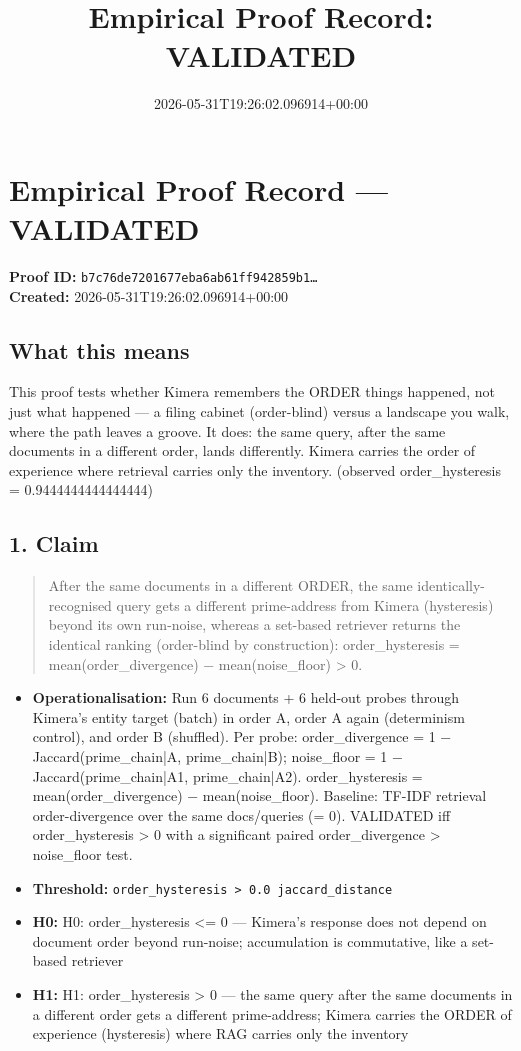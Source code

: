 \documentclass{article}
\title{Empirical Proof Record: VALIDATED}
\date{2026-05-31T19:26:02.096914+00:00}
\begin{document}
\maketitle
\section*{Empirical Proof Record --- \textcolor{validated}{\textbf{VALIDATED}}}
\textbf{Proof ID:} \texttt{b7c76de7201677eba6ab61ff942859b1\dots}\\
\textbf{Created:} 2026-05-31T19:26:02.096914+00:00
\subsection*{What this means}
This proof tests whether Kimera remembers the ORDER things happened, not just what happened — a filing cabinet (order-blind) versus a landscape you walk, where the path leaves a groove. It does: the same query, after the same documents in a different order, lands differently. Kimera carries the order of experience where retrieval carries only the inventory. (observed order\_hysteresis = 0.9444444444444444)
\subsection*{1. Claim}
\begin{quote}After the same documents in a different ORDER, the same identically-recognised query gets a different prime-address from Kimera (hysteresis) beyond its own run-noise, whereas a set-based retriever returns the identical ranking (order-blind by construction): order\_hysteresis = mean(order\_divergence) − mean(noise\_floor) > 0.\end{quote}
\begin{itemize}
\item \textbf{Operationalisation:} Run 6 documents + 6 held-out probes through Kimera's entity target (batch) in order A, order A again (determinism control), and order B (shuffled). Per probe: order\_divergence = 1 − Jaccard(prime\_chain|A, prime\_chain|B); noise\_floor = 1 − Jaccard(prime\_chain|A1, prime\_chain|A2). order\_hysteresis = mean(order\_divergence) − mean(noise\_floor). Baseline: TF-IDF retrieval order-divergence over the same docs/queries (= 0). VALIDATED iff order\_hysteresis > 0 with a significant paired order\_divergence > noise\_floor test.
\item \textbf{Threshold:} \texttt{order\_hysteresis > 0.0 jaccard\_distance}
\item \textbf{H0:} H0: order\_hysteresis <= 0 — Kimera's response does not depend on document order beyond run-noise; accumulation is commutative, like a set-based retriever
\item \textbf{H1:} H1: order\_hysteresis > 0 — the same query after the same documents in a different order gets a different prime-address; Kimera carries the ORDER of experience (hysteresis) where RAG carries only the inventory
\end{itemize}
\end{document}
